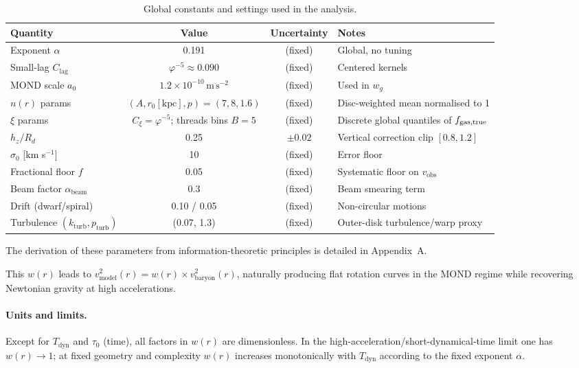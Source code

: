 \documentclass[12pt,a4paper]{article}
\begin{document}
\begin{table}[h]
\centering
\caption{Global constants and settings used in the analysis.}
\label{tab:parameters}
\begin{tabular}{l c c l}
\toprule
Quantity & Value & Uncertainty & Notes \\
\midrule
Exponent $\alpha$ & 0.191 & (fixed) & Global, no tuning \\
Small-lag $C_\mathrm{lag}$ & $\varphi^{-5} \approx 0.090$ & (fixed) & Centered kernels \\
MOND scale $a_0$ & $1.2\times10^{-10}\,\mathrm{m\,s^{-2}}$ & (fixed) & Used in $w_g$ \\
$n(r)$ params & $(A, r_0[\mathrm{kpc}], p)=(7,8,1.6)$ & (fixed) & Disc-weighted mean normalised to 1 \\
$\xi$ params & $C_\xi=\varphi^{-5}$; threads bins $B{=}5$ & (fixed) & Discrete global quantiles of $f_{\rm gas,true}$ \\
$h_z/R_d$ & 0.25 & $\pm 0.02$ & Vertical correction clip $[0.8,1.2]$ \\
$\sigma_0$ [km s$^{-1}$] & 10 & (fixed) & Error floor \\
Fractional floor $f$ & 0.05 & (fixed) & Systematic floor on $v_\mathrm{obs}$ \\
Beam factor $\alpha_\mathrm{beam}$ & 0.3 & (fixed) & Beam smearing term \\
Drift (dwarf/spiral) & 0.10 / 0.05 & (fixed) & Non-circular motions \\
Turbulence $(k_\mathrm{turb},p_\mathrm{turb})$ & (0.07, 1.3) & (fixed) & Outer-disk turbulence/warp proxy \\
\bottomrule
\end{tabular}
\end{table}

The derivation of these parameters from information-theoretic principles is detailed in Appendix~A.

This $w(r)$ leads to $v^2_\mathrm{model}(r) = w(r) \times v^2_\mathrm{baryon}(r)$, naturally producing flat rotation curves in the MOND regime while recovering Newtonian gravity at high accelerations.

\paragraph{Units and limits.} Except for $T_\mathrm{dyn}$ and $\tau_0$ (time), all factors in $w(r)$ are dimensionless. In the high-acceleration/short-dynamical-time limit one has $w(r)\to 1$; at fixed geometry and complexity $w(r)$ increases monotonically with $T_\mathrm{dyn}$ according to the fixed exponent $\alpha$.
\end{document}
